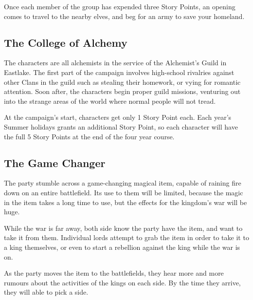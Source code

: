 {\begin{multicols}{2}
Once each member of the group has expended three Story Points, an opening comes to travel to the nearby elves, and beg for an army to save your homeland.

\subsection{The College of Alchemy}

The characters are all alchemists in the service of the Alchemist's Guild in Eastlake.
The first part of the campaign involves high-school rivalries against other Clans in the guild such as stealing their homework, or vying for romantic attention.
Soon after, the characters begin proper guild missions, venturing out into the strange areas of the world where normal people will not tread.

At the campaign's start, characters get only 1 Story Point each.
Each year's Summer holidays grants an additional Story Point, so each character will have the full 5 Story Points at the end of the four year course.

\subsection{The Game Changer}

The party stumble across a game-changing magical item, capable of raining fire down on an entire battlefield.
Its use to them will be limited, because the magic in the item takes a long time to use, but the effects for the kingdom's war will be huge.

While the war is far away, both side know the party have the item, and want to take it from them.
Individual lords attempt to grab the item in order to take it to a king themselves, or even to start a rebellion against the king while the war is on.

As the party moves the item to the battlefields, they hear more and more rumours about the activities of the kings on each side.
By the time they arrive, they will able to pick a side.

\end{multicols}

}{}
